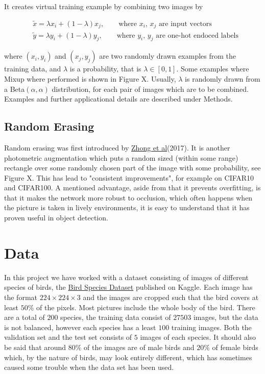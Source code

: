 \documentclass{article}
\begin{document}
It creates virtual training example by combining two images by 

\begin{align*}
&\tilde{x} = \lambda x_i + (1-\lambda) x_j, \qquad \text{where $x_i$, $x_j$ are input vectors} \\
&\tilde{y} = \lambda y_i + (1-\lambda) y_j, \qquad \text{where $y_i$, $y_j$ are one-hot endoced labels}
\end{align*}


where $(x_i, y_i)$ and $(x_j, y_j)$ are two randomly drawn examples from the training data, and $\lambda$ 
is a probability, that is $\lambda \in [0,1]$. Some examples where Mixup where performed is shown in Figure X.  Usually, $\lambda$ is randomly drawn from a Beta$(\alpha, \alpha)$ 
distribution, for each pair of images which are to be combined. Examples and further applicational details are described under Methods. 


\subsection{Random Erasing}
Random erasing was first introduced by \href{https://arxiv.org/pdf/1708.04896.pdf}{Zhong et al}(2017). It is another photometric augmentation which puts a random sized (within some range) rectangle over some randomly chosen part of the image with some probability, see Figure X. This has lead to "consistent improvements", for example on CIFAR10 and CIFAR100. A mentioned advantage, aside from that it prevents overfitting, is that it makes the network more robust to occlusion, which often happens when the picture is taken in lively environments, it is easy to understand that it has proven useful in object detection. 

\section{Data}

In this project we have worked with a dataset consisting of images of different species of birds, the  
\href{https://www.kaggle.com/gpiosenka/100-bird-species}{Bird Species Dataset} published on Kaggle. Each image has the format $224 \times 224 \times 3$ and the images are cropped such that the bird covers at least $50$\% of the pixels. Most pictures include the whole body of the bird.
There are 
a total of $200$ species, the training data consist of $27503$ images, but the data is not balanced, however each species has a least $100$ training images. 
Both the validation set and the test set consists of $5$ images of each species. 
It should also be said that around $80\%$ of the images are of male birds and $20\%$ of female 
birds which, by the nature of birds, may look entirely different, which has sometimes caused some trouble when the data set has been used.
\end{document}
